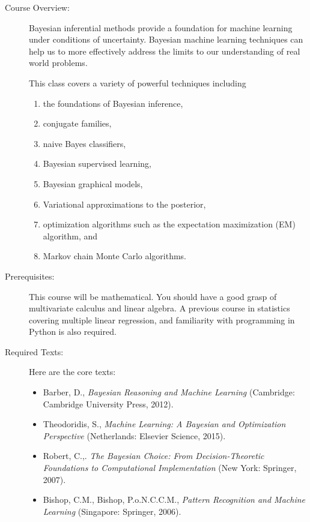 \documentclass[11pt]{article}
\begin{document}
\begin{description}

\item[Course Overview:] 

Bayesian inferential methods provide a foundation for machine learning under conditions of uncertainty. Bayesian machine learning techniques can help us to more effectively address the limits to our understanding of real world problems. 

This class covers a variety of powerful techniques including 

\begin{enumerate}
\item the foundations of Bayesian inference,
\item conjugate families,
\item naive Bayes classifiers,
\item Bayesian supervised learning,
\item Bayesian graphical models, 
\item Variational approximations to the posterior,
\item optimization algorithms such as the expectation maximization (EM) algorithm, and
\item Markov chain Monte Carlo algorithms.
\end{enumerate}

\item[Prerequisites:] This course will be mathematical. You should have a good grasp of multivariate calculus and linear
algebra. A previous course in statistics covering multiple linear regression, and familiarity with programming in Python is also required.

\item[Required Texts:]  

Here are the core texts:

\begin{itemize}
\item Barber, D., \textit{Bayesian Reasoning and Machine Learning} (Cambridge: Cambridge University Press, 2012).
\item Theodoridis, S., \textit{Machine Learning: A Bayesian and Optimization Perspective } (Netherlands:
Elsevier Science, 2015).
\item Robert, C.,. \textit{The Bayesian Choice: From Decision-Theoretic Foundations to Computational
Implementation} (New York: Springer, 2007).
\item Bishop, C.M., Bishop, P.o.N.C.C.M., \textit{Pattern Recognition and Machine Learning} (Singapore:
Springer, 2006).
\end{itemize}


\end{description}
\end{document}
